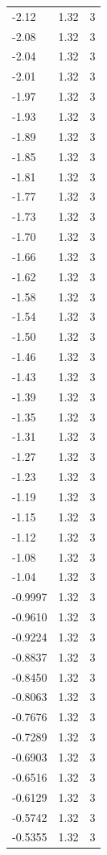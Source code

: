 \begin{longtable}{lrr}
  -2.12 & 1.32 & 3 \\
  -2.08 & 1.32 & 3 \\
  -2.04 & 1.32 & 3 \\
  -2.01 & 1.32 & 3 \\
  -1.97 & 1.32 & 3 \\
  -1.93 & 1.32 & 3 \\
  -1.89 & 1.32 & 3 \\
  -1.85 & 1.32 & 3 \\
  -1.81 & 1.32 & 3 \\
  -1.77 & 1.32 & 3 \\
  -1.73 & 1.32 & 3 \\
  -1.70 & 1.32 & 3 \\
  -1.66 & 1.32 & 3 \\
  -1.62 & 1.32 & 3 \\
  -1.58 & 1.32 & 3 \\
  -1.54 & 1.32 & 3 \\
  -1.50 & 1.32 & 3 \\
  -1.46 & 1.32 & 3 \\
  -1.43 & 1.32 & 3 \\
  -1.39 & 1.32 & 3 \\
  -1.35 & 1.32 & 3 \\
  -1.31 & 1.32 & 3 \\
  -1.27 & 1.32 & 3 \\
  -1.23 & 1.32 & 3 \\
  -1.19 & 1.32 & 3 \\
  -1.15 & 1.32 & 3 \\
  -1.12 & 1.32 & 3 \\
  -1.08 & 1.32 & 3 \\
  -1.04 & 1.32 & 3 \\
  -0.9997 & 1.32 & 3 \\
  -0.9610 & 1.32 & 3 \\
  -0.9224 & 1.32 & 3 \\
  -0.8837 & 1.32 & 3 \\
  -0.8450 & 1.32 & 3 \\
  -0.8063 & 1.32 & 3 \\
  -0.7676 & 1.32 & 3 \\
  -0.7289 & 1.32 & 3 \\
  -0.6903 & 1.32 & 3 \\
  -0.6516 & 1.32 & 3 \\
  -0.6129 & 1.32 & 3 \\
  -0.5742 & 1.32 & 3 \\
  -0.5355 & 1.32 & 3 \\

\end{longtable}
